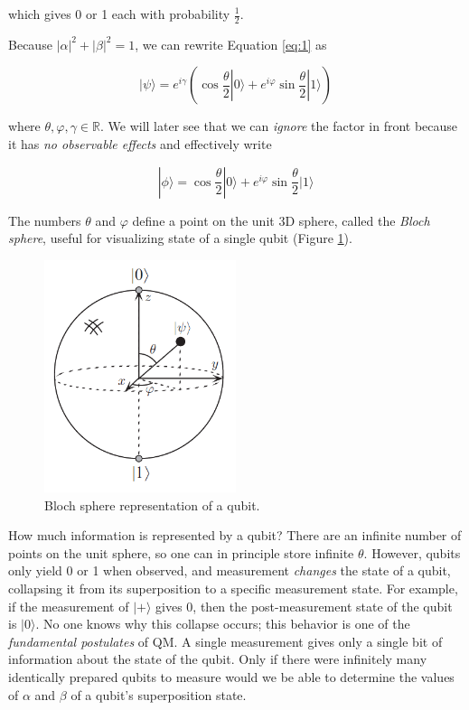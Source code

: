 \documentclass{article}
\numberwithin{equation}{section}
\newcommand{\bracket}[1]{|#1\rangle}
\begin{document}
which gives 0 or 1 each with probability $\frac{1}{2}$.

Because $|\alpha|^2 + |\beta|^2 = 1$, we can rewrite Equation \ref{eq:1} as

\begin{equation} \label{eq:1.3}
\bracket{\psi} = e^{i \gamma} \left(\cos \frac{\theta}{2} \bracket{0} + e^{i \varphi} \sin \frac{\theta}{2} \bracket{1} \right)
\end{equation}

where $\theta, \varphi, \gamma \in \mathbb{R}$. We will later see that we can \textit{ignore} the factor in front because it has \textit{no observable effects} and effectively write

\begin{equation} \label{eq:1.4}
\bracket{\phi} = \cos \frac{\theta}{2} \bracket{0} + e^{i \varphi} \sin \frac{\theta}{2} \bracket{1}
\end{equation}

The numbers $\theta$ and $\varphi$ define a point on the unit 3D sphere, called the \textit{Bloch sphere}, useful for visualizing state of a single qubit (Figure \ref{fig:1.1}).

\begin{figure} \label{fig:1.1}
	\centering
	\includegraphics[width=0.5\textwidth]{bloch_sphere.png}
	\caption{Bloch sphere representation of a qubit.}
\end{figure}

How much information is represented by a qubit? There are an infinite number of points on the unit sphere, so one can in principle store infinite $\theta$. However, qubits only yield 0 or 1 when observed, and measurement \textit{changes} the state of a qubit, collapsing it from its superposition to a specific measurement state. For example, if the measurement of $\bracket{+}$ gives 0, then the post-measurement state of the qubit is $\bracket{0}$. No one knows why this collapse occurs; this behavior is one of the \textit{fundamental postulates} of QM. A single measurement gives only a single bit of information about the state of the qubit. Only if there were infinitely many identically prepared qubits to measure would we be able to determine the values of $\alpha$ and $\beta$ of a qubit's superposition state.
\end{document}

